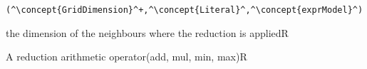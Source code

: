 \begin{lstlisting}[style=default,frame=none]
(^\concept{GridDimension}^+,^\concept{Literal}^,^\concept{exprModel}^)
\end{lstlisting}

\begin{HIRChildElements} 
	{the dimension of the neighbours where the reduction is applied}{R}
\end{HIRChildElements}
 
\begin{HIRAttributesVal}
	{A reduction arithmetic operator}{(add, mul, min, max)}{R}
\end{HIRAttributesVal}


